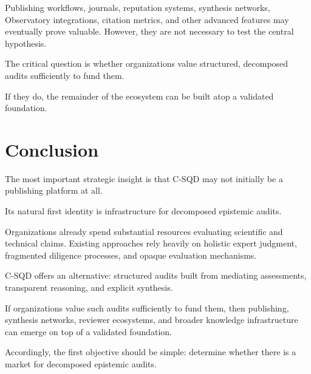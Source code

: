 \documentclass[11pt]{article}
\begin{document}
Publishing workflows, journals, reputation systems, synthesis networks, Observatory integrations, citation metrics, and other advanced features may eventually prove valuable. However, they are not necessary to test the central hypothesis.

The critical question is whether organizations value structured, decomposed audits sufficiently to fund them.

If they do, the remainder of the ecosystem can be built atop a validated foundation.

\section*{Conclusion}

The most important strategic insight is that C-SQD may not initially be a publishing platform at all.

Its natural first identity is infrastructure for decomposed epistemic audits.

Organizations already spend substantial resources evaluating scientific and technical claims. Existing approaches rely heavily on holistic expert judgment, fragmented diligence processes, and opaque evaluation mechanisms.

C-SQD offers an alternative: structured audits built from mediating assessments, transparent reasoning, and explicit synthesis.

If organizations value such audits sufficiently to fund them, then publishing, synthesis networks, reviewer ecosystems, and broader knowledge infrastructure can emerge on top of a validated foundation.

Accordingly, the first objective should be simple: determine whether there is a market for decomposed epistemic audits.
\end{document}
